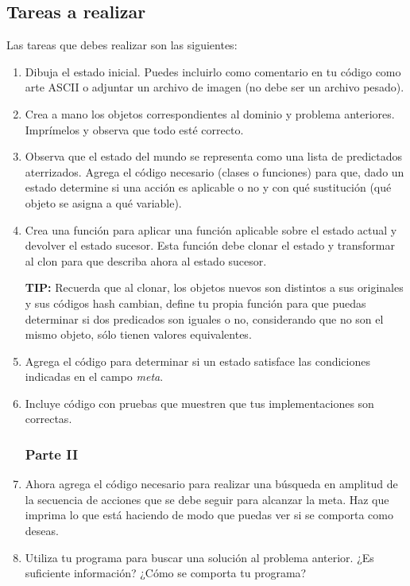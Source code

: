 \subsection{Tareas a realizar}

Las tareas que debes realizar son las siguientes:
\begin{enumerate}
\subsubsection{Parte I}
 \item Dibuja el estado inicial.  Puedes incluirlo como comentario en tu código como arte ASCII o adjuntar un archivo de imagen (no debe ser un archivo pesado).

 \item Crea a mano los objetos correspondientes al dominio y problema anteriores.
       Imprímelos y observa que todo esté correcto.

 \item Observa que el estado del mundo se representa como una lista de predictados aterrizados.
       Agrega el código necesario (clases o funciones) para que, dado un estado determine si una
       acción es aplicable o no y con qué sustitución (qué objeto se asigna a qué variable).

 \item Crea una función para aplicar una función aplicable sobre el estado actual y devolver el estado sucesor.  Esta función debe clonar el estado y transformar al clon para que describa ahora al estado sucesor.

 \textbf{TIP:}  Recuerda que al clonar, los objetos nuevos son distintos a sus originales y sus códigos hash cambian, define tu propia función para que puedas determinar si dos predicados son iguales o no, considerando que no son el mismo objeto, sólo tienen valores equivalentes.

 \item Agrega el código para determinar si un estado satisface las condiciones indicadas en el campo \emph{meta}.

 \item Incluye código con pruebas que muestren que tus implementaciones son correctas.
       
\subsubsection{Parte II}
 \item Ahora agrega el código necesario para realizar una búsqueda en amplitud de la secuencia
       de acciones que se debe seguir para alcanzar la meta.  Haz que imprima lo que está
       haciendo de modo que puedas ver si se comporta como deseas.
 \item Utiliza tu programa para buscar una solución al problema anterior.
       ¿Es suficiente información? ¿Cómo se comporta tu programa?
\end{enumerate}
